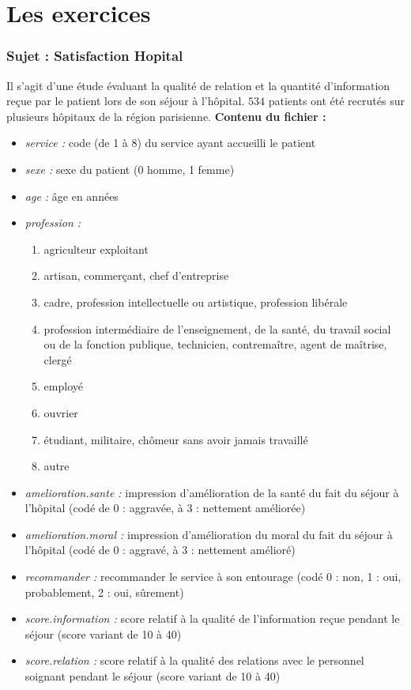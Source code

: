 \newpage



\part{Les exercices}

\section{Sujet : Satisfaction Hopital}
Il s'agit d'une étude évaluant la qualité de relation et la quantité d'information reçue par le patient lors de son séjour à l'hôpital. $534$ patients ont été recrutés sur plusieurs hôpitaux de la région parisienne.\newline
\textbf{Contenu du fichier :}
\begin{itemize}
\item \textit{service :} code (de 1 à 8) du service ayant accueilli le patient
\item \textit{sexe :} sexe du patient (0 homme, 1 femme)
\item \textit{age :} âge en années
\item \textit{profession :}
\begin{enumerate}
\item agriculteur exploitant
\item artisan, commerçant, chef d'entreprise
\item cadre, profession intellectuelle ou artistique, profession libérale
\item profession intermédiaire de l'enseignement, de la santé, du travail social ou de la fonction publique, technicien, contremaître, agent de maîtrise, clergé
\item employé
\item ouvrier
\item étudiant, militaire, chômeur sans avoir jamais travaillé
\item autre
\end{enumerate}
\item \textit{amelioration.sante :} impression d'amélioration de la santé du fait du séjour à l'hôpital (codé de 0 : aggravée, à 3 : nettement améliorée)
\item \textit{amelioration.moral :} impression d'amélioration du moral du fait du séjour à l'hôpital (codé de 0 : aggravé, à 3 : nettement amélioré)
\item \textit{recommander :} recommander le service à son entourage (codé 0 : non, 1 : oui, probablement, 2 : oui, sûrement)
\item \textit{score.information :} score relatif à la qualité de l'information reçue pendant le séjour (score variant de 10 à 40)
\item \textit{score.relation :} score relatif à la qualité des relations avec le personnel soignant pendant le séjour (score variant de 10 à 40)
\end{itemize}

